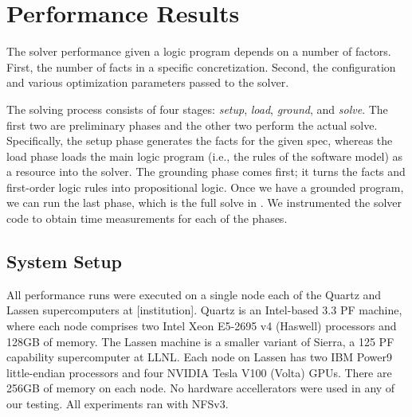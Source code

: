 \section{Performance Results}
\label{sec:perf-results}


The \clingo{} solver performance given a logic program depends on a number of factors.
First, the number of facts in a specific concretization. Second, the configuration and
various optimization parameters passed to the solver.

The solving process consists of four stages: \emph{setup}, \emph{load}, \emph{ground},
and \emph{solve}. The first two are preliminary phases and the other two perform the
actual solve. Specifically, the setup phase generates the facts for the given spec,
whereas the load phase loads the main logic program (i.e., the rules of the software
model) as a resource into the solver. The grounding phase comes first; it turns the
facts and first-order logic rules into propositional logic. Once we have a grounded
program, we can run the last phase, which is the full solve in \clingo{}.
%
We instrumented the solver code to obtain time measurements for each of the
phases.

% 

% 



\subsection{System Setup}

All performance runs were executed on a single node each of the Quartz and Lassen
supercomputers at [institution].
Quartz is an Intel-based 3.3 PF machine, where each node comprises two Intel Xeon E5-2695 v4
(Haswell) processors and 128GB of memory. The Lassen machine is a smaller variant of
Sierra, a 125 PF capability supercomputer at LLNL. Each node on Lassen has two IBM
Power9 little-endian processors and four NVIDIA Tesla V100 (Volta) GPUs. There are 256GB
of memory on each node. No hardware accellerators were used in any of our testing. All
experiments ran with NFSv3.

